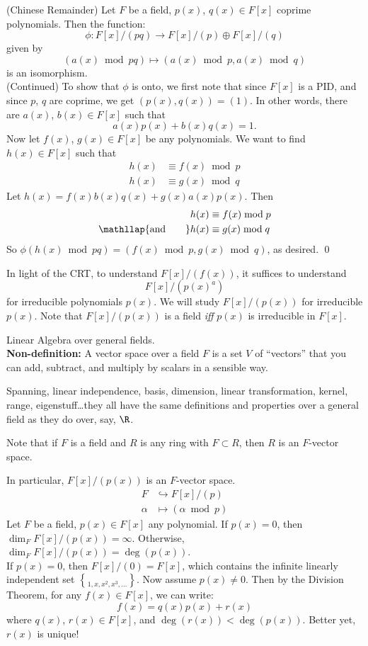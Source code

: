 \thm (Chinese Remainder) Let $F$ be a field, $p(x)$, $q(x)\in F[x]$ coprime polynomials.  Then the function:
\[ \phi\colon F[x] / (pq) \to F[x] /(p) \oplus F[x] / (q) \]
given by
\[ (a(x)\bmod pq) \mapsto (a(x)\bmod p,a(x)\bmod q) \]
is an isomorphism. \\
\pf (Continued) To show that $\phi$ is onto, we first note that since $F[x]$ is a PID, and since $p$, $q$ are coprime, we get $(p(x),q(x))=(1)$.  In other words, there are $a(x)$, $b(x)\in F[x]$ such that
\[ a(x) p(x) + b(x) q(x) = 1 . \]
Now let $f(x)$, $g(x)\in F[x]$ be any polynomials.  We want to find $h(x)\in F[x]$ such that
\begin{align*}
h(x) &\equiv f(x) \bmod p \\
h(x) &\equiv g(x) \bmod q
\end{align*}
Let $h(x)=f(x)b(x)q(x)+g(x)a(x)p(x)$.  Then
\begin{align*}
h(x) &\equiv f(x) \bmod p \\
\mathllap{\text{and}\qquad} h(x) &\equiv g(x) \bmod q
\end{align*}
So $\phi(h(x)\bmod pq)=(f(x)\bmod p,g(x)\bmod q)$, as desired. \qed

In light of the CRT, to understand $F[x]/(f(x))$, it suffices to understand
\[ F[x] / (p(x)^a) \]
for irreducible polynomials $p(x)$.  We will study $F[x]/(p(x))$ for irreducible $p(x)$.  Note that $F[x]/(p(x))$ is a field \emph{iff} $p(x)$ is irreducible in $F[x]$.

Linear Algebra over general fields. \\
\textbf{Non-definition:} A vector space over a field $F$ is a set $V$ of ``vectors'' that you can add, subtract, and multiply by scalars in a sensible way.

Spanning, linear independence, basis, dimension, linear transformation, kernel, range, eigenstuff\ldots they all have the same definitions and properties over a general field as they do over, say, $\R$.

Note that if $F$ is a field and $R$ is any ring with $F\subset R$, then $R$ is an $F$-vector space.

In particular, $F[x]/(p(x))$ is an $F$-vector space.
\begin{align*}
F &\hookrightarrow F[x]/(p) \\
\alpha &\mapsto (\alpha\bmod p)
\end{align*}
\thm Let $F$ be a field, $p(x)\in F[x]$ any polynomial. If $p(x)=0$, then $\dim_F F[x]/(p(x))=\infty$.  Otherwise, $\dim_F F[x]/(p(x))=\deg(p(x))$. \\
\pf If $p(x)=0$, then $F[x]/(0)=F[x]$, which contains the infinite linearly independent set $\brace{1,x,x^2,x^3,\dotsc}$.  Now assume $p(x)\neq0$.  Then by the Division Theorem, for any $f(x)\in F[x]$, we can write:
\[ f(x) = q(x)p(x) + r(x) \]
where $q(x)$, $r(x)\in F[x]$, and $\deg(r(x))<\deg(p(x))$.  Better yet, $r(x)$ is unique!

